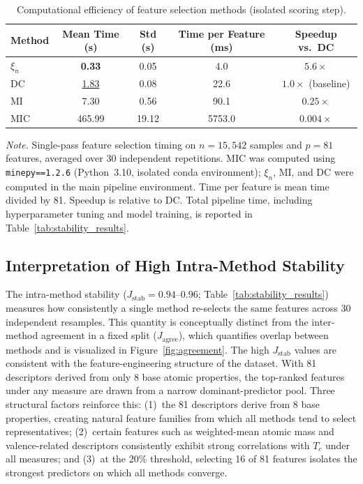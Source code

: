 \documentclass[twoside,11pt]{article}
\begin{document}
\begin{table}[t]
\centering
\begin{threeparttable}
\caption{Computational efficiency of feature selection methods (isolated scoring
step).}
\label{tab:feature_selection_timing}
\begin{tabular}{lcccc}
\toprule
Method & Mean Time (s) & Std (s) & Time per Feature (ms) & Speedup vs.\ DC \\
\midrule
$\xi_n$ & \textbf{0.33} & 0.05 & \phantom{0}4.0 & $5.6\times$ \\
DC      & \underline{1.83} & 0.08 & \phantom{0}22.6 & $1.0\times$ (baseline) \\
MI      & 7.30 & 0.56 & \phantom{0}90.1 & $0.25\times$ \\
MIC     & 465.99 & 19.12 & 5753.0 & $0.004\times$ \\
\bottomrule
\end{tabular}
\begin{tablenotes}
\item[]\footnotesize \textit{Note.} Single-pass feature selection timing on
$n = 15{,}542$ samples and $p = 81$ features, averaged over 30 independent
repetitions. MIC was computed using \texttt{minepy==1.2.6}
\citep{Albanese2013minepy} (Python~3.10, isolated conda environment);
$\xi_n$, MI, and DC were computed in the main pipeline environment.
Time per feature is mean time divided by 81. Speedup is relative to DC.
Total pipeline time, including hyperparameter tuning and model training,
is reported in Table~\ref{tab:stability_results}.
\end{tablenotes}
\end{threeparttable}
\end{table}

\subsection{Interpretation of High Intra-Method Stability}
The intra-method stability ($J_{\mathrm{stab}} = 0.94$--$0.96$;
Table~\ref{tab:stability_results}) measures how consistently a single method
re-selects the same features across 30 independent resamples. This quantity is
conceptually distinct from the inter-method agreement in a fixed split
($J_{\mathrm{agree}}$), which quantifies overlap between methods and is
visualized in Figure~\ref{fig:agreement}. The high $J_{\mathrm{stab}}$ values
are consistent with the feature-engineering structure of the dataset. With 81
descriptors derived from only 8 base atomic properties, the top-ranked features
under any measure are drawn from a narrow dominant-predictor pool. Three
structural factors reinforce this: (1)~the 81 descriptors derive from 8 base
properties, creating natural feature families from which all methods tend to
select representatives; (2)~certain features such as weighted-mean atomic mass
and valence-related descriptors consistently exhibit strong correlations with
$T_c$ under all measures; and (3)~at the 20\% threshold, selecting 16 of 81
features isolates the strongest predictors on which all methods converge.
\end{document}
